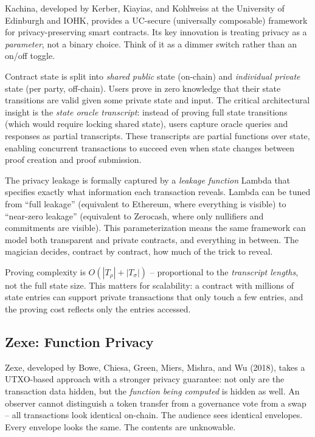 \documentclass[
  11pt,
  openany]{report}
\begin{document}
Kachina, developed by Kerber, Kiayias, and Kohlweiss at the University of
Edinburgh and IOHK, provides a UC-secure (universally composable) framework for
privacy-preserving smart contracts. Its key innovation is treating privacy as a
\emph{parameter}, not a binary choice. Think of it as a dimmer switch rather
than an on/off toggle.

Contract state is split into \emph{shared public} state (on-chain) and
\emph{individual private} state (per party, off-chain). Users prove in zero
knowledge that their state transitions are valid given some private state and
input. The critical architectural insight is the \emph{state oracle transcript}:
instead of proving full state transitions (which would require locking shared
state), users capture oracle queries and responses as partial transcripts. These
transcripts are partial functions over state, enabling concurrent transactions
to succeed even when state changes between proof creation and proof submission.

The privacy leakage is formally captured by a \emph{leakage function} Lambda
that specifies exactly what information each transaction reveals. Lambda can be
tuned from ``full leakage'' (equivalent to Ethereum, where everything is
visible) to ``near-zero leakage'' (equivalent to Zerocash, where only nullifiers
and commitments are visible). This parameterization means the same framework can
model both transparent and private contracts, and everything in between. The
magician decides, contract by contract, how much of the trick to reveal.

Proving complexity is \(O(|T_\rho| + |T_\sigma|)\) -- proportional to the
\emph{transcript lengths}, not the full state size. This matters for
scalability: a contract with millions of state entries can support private
transactions that only touch a few entries, and the proving cost reflects only
the entries accessed.

\subsection{Zexe: Function Privacy}\label{zexe-function-privacy}

Zexe, developed by Bowe, Chiesa, Green, Miers, Mishra, and Wu (2018), takes a
UTXO-based approach with a stronger privacy guarantee: not only are the
transaction data hidden, but the \emph{function being computed} is hidden as
well. An observer cannot distinguish a token transfer from a governance vote
from a swap -- all transactions look identical on-chain. The audience sees
identical envelopes. Every envelope looks the same. The contents are unknowable.
\end{document}
